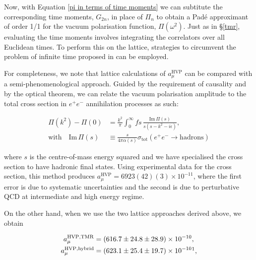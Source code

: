 \documentclass{article}
\numberwithin{equation}{section} %
\begin{document}
Now, with Equation \ref{pi in terms of time moments} we can subtitute the corresponding time moments, $G_{2n}$, in place of $\Pi_n$ to obtain a Pad\'e approximant of order 1/1 for the vacuum polarisation function, $\Pi(\omega^2)$. Just as in \S \ref{tmr}, evaluating the time moments involves integrating the correlators over all Euclidean times. To perform this on the lattice, strategies to circumvent the problem of infinite time proposed in \cite{dellamorte} can be employed.

For completeness, we note that lattice calculations of $a_\mu^\mathrm{HVP}$ can be compared with a semi-phenomenological approach. Guided by the requirement of causality\cite{lehnerg2} and by the optical theorem\cite{jackson}, we can relate the vacuum polarisation amplitude to the total cross section in $e^+e^-$ annihilation processes as such:

\begin{equation}
\begin{split}
\Pi(k^2) - \Pi(0) &= \frac{k^2}{\pi}\int^\infty_0 fs\, \frac{\mathrm{Im}\, \Pi(s)}{s(s-k^2-i\epsilon)},\\
\mathrm{with} \quad\mathrm{Im} \, \Pi(s) &\equiv \frac{s}{4\pi\alpha(s)}\sigma_\mathrm{tot}(e^+e^-\rightarrow \mathrm{hadrons})
\end{split}
\end{equation}

\noindent where $s$ is the centre-of-mass energy squared and we have specialised the cross section to have hadronic final states. Using experimental data for the cross section, this method produces $a_\mu^\mathrm{HVP}=6923(42)(3)\times 10^{-11}$, where the first error is due to systematic uncertainties and the second is due to perturbative QCD at intermediate and high energy regime\cite{hoecker}.

On the other hand, when we use the two lattice approaches derived above, we obtain\cite{dellamorte}

\begin{equation}
\begin{split}
a_\mu^\mathrm{HVP,TMR} &= (616.7 \pm 24.8 \pm 28.9) \times 10^{-10} ,\\
a_\mu^\mathrm{HVP,hybrid}&= (623.1 \pm 25.4 \pm 19.7) \times 10^{-10}\footnotemark , 
\end{split}
\end{equation}
\end{document}
